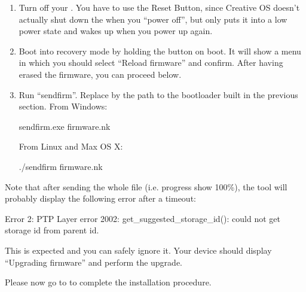 \begin{enumerate}
  \item Turn off your \dap{}. You have to use the Reset Button, since Creative OS
    doesn't actually shut down the \dap{} when you ``power off'', but only
    puts it into a low power state and wakes up when you power up again.

  \item Boot into recovery mode by holding the \ButtonPlay{} button on boot.
    It will show a menu in which you should select ``Reload firmware''
    and confirm. After having erased the firmware, you can proceed below.

  \item Run ``sendfirm''. Replace  by the path to the
    bootloader built in the previous section.
    From Windows:%
    \begin{code}[firstline=\opt{creativezen}{1},%
                 lastline=\opt{creativezen}{1}]
      sendfirm.exe firmware.nk
    \end{code}
  From Linux and Max OS X:\
    \begin{code}[firstline=\opt{creativezen}{1},%
                 lastline=\opt{creativezen}{1}]
      ./sendfirm firmware.nk
    \end{code}

\end{enumerate}

Note that after sending the whole file (i.e. progress show 100\%), the tool
will probably display the following error after a timeout:%
\begin{code}[firstline=\opt{creativezen}{1},%
             lastline=\opt{creativezen}{1}]
  Error 2: PTP Layer error 2002: get\_suggested\_storage\_id(): could not get storage id from parent id.
\end{code}
This is expected and you can safely ignore it. Your device should display
``Upgrading firmware'' and perform the upgrade.

Please now go to  to complete the installation procedure.
